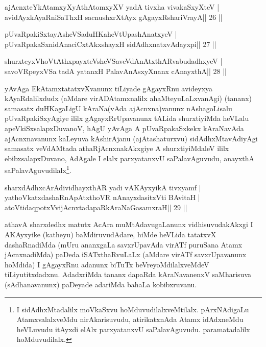 
\begin{shl}
ajAcnxteYkAtamxyXyAthAtomxyXV yadA tivxha vivakaSxyXteV |
avidAyxkAyaRniSaThxH sacnushxrXtAyx gAgayxRshariVrayA\hfill || 26 ||
\end{shl}

\begin{shl}
pUvaRpakiSxtayA\s sheVSaduHKaheVtUpashAnatxyeV |
pUvaRpakaSxnidAnaciCxtAkxshayxH sidAdhxnatxvAdayxpi\hfill || 27 ||
\end{shl}

\begin{shl}
shurxteyxVhoVtAthxpayxteV\s sheVSaveVdAnAtxthARvabudadhxyeV |
savoVR\s peyxVSa tadA yatanxH PalavAnAsxyXnanx cAnayxthA\hfill || 28 ||
\end{shl}

\begin{artha}
yAvAga EkAtamxtatatxvXvanunx tiLiyade gAgayxRnu avideyxya kAyaRdalilxdudx (aMdare virADAtamxnalilx ahaMteyuLaLxvanAgi) (tananx) samasatx  duHKagaLigU kAraNa(vAda ajAcnxna)vanunx nAshagoLisalu pUvaRpakiSxyAgiye  ililx gAgayxRrUpavanunx tALida shurxtiyiMda heVLalu  apeVkiSxsalapxDuvanoV, hAgU yAvAga A pUvaRpakaSxkekx kAraNavAda ajAcnxnavanunx kaLeyuva kAshirAjanu (ajAtashaturxvu) sidAdhxMtavAdiyAgi samasatx veVdAMtada athaRjAcnxnakAkxgiye A shurxtiyiMdaleV ililx ebibxsalapxDuvano, AdAgale I elalx parxyatanxvU saPalavAguvudu, anayxthA saPalavAguvudilalx\footnote{I sidAdhxMtadalilx moVkaSxvu hoMduvudilalxveMtilalx. pArxNAdigaLu AtamxvalalxveMdu nirAkarisuvudu, atirikatxnAda Atamx idAdxneMdu heVLuvudu itAyxdi elAlx parxyatanxvU saPalavAguvudu. paramatadalilx hoMduvudilalx.}.
\end{artha}

\begin{shl}
sharxdAdhxcArAdividhayxthAR yadi vA\s\s KAyxyikA tivxyamf |
yathoVkatxdashaRnApAtxthoVR nAnayxdasitxVti BAvitaH |
atoV\s tidaqpotxV\s vijAcnxtadapaRkAraNaGasamxraH\hfill || 29 ||
\end{shl}

\begin{artha}
athavA sharxdedhx matutx AcAra muMtAdavugaLanunx vidhisuvudakAkxgi I AKAyxyike (katheyu) baMdiruvudAdare, hiMde heVLida tatatxvX dashaRnadiMda (mUru ananxgaLa savxrUpavAda virATf puruSana Atamx jAcnxnadiMda) paDeda iSATxthaRvuLaLx (aMdare virATf savxrUpavanunx hoMdida) I gAgayxRnu adanunx biTuTx beVreyoMdilalxveMdeV tiLiyutitxdadxnu. AdadxriMda tananx dapaRda kAraNavanenxV saMharisuva (sAdhanavanunx) paDeyade adariMda bahaLa kobibxruvanu.
\end{artha}

